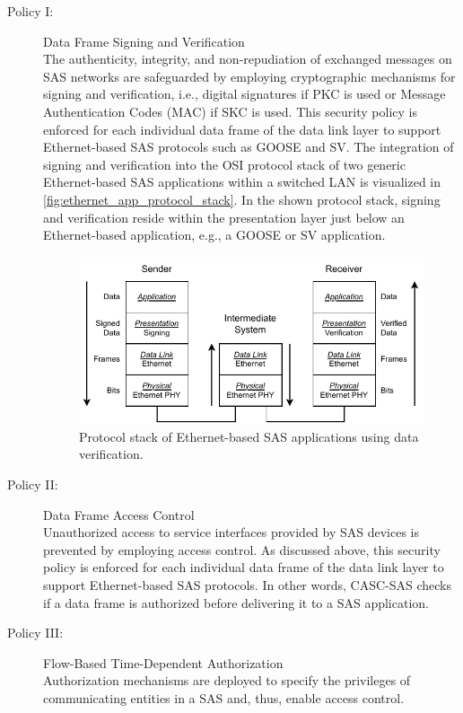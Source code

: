 \begin{description}
    \item[Policy I:] Data Frame Signing and Verification\\%
    The authenticity, integrity, and non-repudiation of exchanged messages on SAS networks are safeguarded by employing cryptographic mechanisms for signing and verification, i.e., digital signatures if PKC is used or Message Authentication Codes (MAC) if SKC is used.
    This security policy is enforced for each individual data frame of the data link layer to support Ethernet-based SAS protocols such as GOOSE and SV.
    The integration of signing and verification into the OSI protocol stack of two generic Ethernet-based SAS applications within a switched LAN is visualized in \autoref{fig:ethernet_app_protocol_stack}.
    In the shown protocol stack, signing and verification reside within the presentation layer just below an Ethernet-based application, e.g., a GOOSE or SV application.
    \begin{figure}
        \centering
        \includegraphics[width=0.7\linewidth]{figures/signed_ethernet_app_protocol_stack.drawio.pdf}
        \caption{Protocol stack of Ethernet-based SAS applications using data verification.}
        \label{fig:ethernet_app_protocol_stack}
    \end{figure}
    \item[Policy II:] Data Frame Access Control\\%
    Unauthorized access to service interfaces provided by SAS devices is prevented by employing access control.
    As discussed above, this security policy is enforced for each individual data frame of the data link layer to support Ethernet-based SAS protocols.
    In other words, CASC-SAS checks if a data frame is authorized before delivering it to a SAS application.
    \item[Policy III:] Flow-Based Time-Dependent Authorization\\%
    Authorization mechanisms are deployed to specify the privileges of communicating entities in a SAS and, thus, enable access control.

\end{description}

